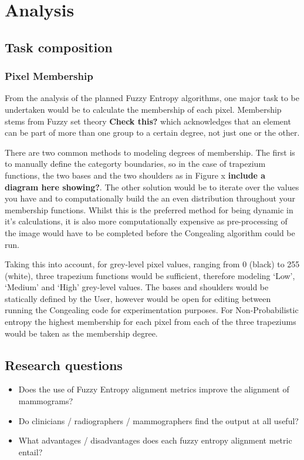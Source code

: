 \section{Analysis}

\subsection{Task composition}

\subsubsection{Pixel Membership}

From the analysis of the planned Fuzzy Entropy algorithms, one major task to be undertaken would be to calculate the membership of each pixel. Membership stems from Fuzzy set theory \textbf{Check this?} which acknowledges that an element can be part of more than one group to a certain degree, not just one or the other. 

There are two common methods to modeling degrees of membership. The first is to manually define the categorty boundaries, so in the case of trapezium functions, the two bases and the two shoulders as in Figure x \textbf{include a diagram here showing?}. The other solution would be to iterate over the values you have and to computationally build the an even distribution throughout your membership functions. Whilst this is the preferred method for being dynamic in it's calculations, it is also more computationally expensive as pre-processing of the image would have to be completed before the Congealing algorithm could be run.

Taking this into account, for grey-level pixel values, ranging from 0 (black) to 255 (white), three trapezium functions would be sufficient, therefore modeling `Low', `Medium' and `High' grey-level values. The bases and shoulders would be statically defined by the User, however would be open for editing between running the Congealing code for experimentation purposes. For Non-Probabilistic entropy the highest membership for each pixel from each of the three trapeziums would be taken as the membership degree.

\subsection{Research questions}
\begin{itemize}
\item Does the use of Fuzzy Entropy alignment metrics improve the alignment of mammograms?
\item Do clinicians / radiographers / mammographers find the output at all useful?
\item What advantages / disadvantages does each fuzzy entropy alignment metric entail?
\end{itemize}
